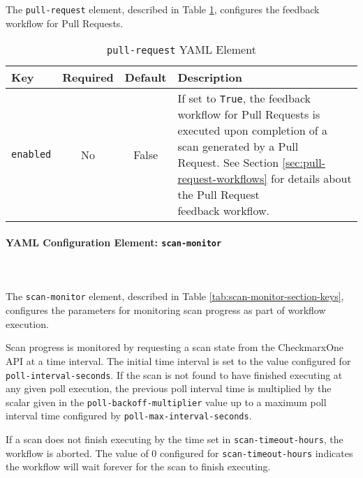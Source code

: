 \noindent\\\\The \texttt{pull-request} element, described in 
Table \ref{tab:pull-request-section-keys}, configures the feedback workflow for
Pull Requests.

\begin{table}[h]
    \caption{\texttt{pull-request} YAML Element}  
    \label{tab:pull-request-section-keys}      
    \begin{tabularx}{\textwidth}{lccl}
        \toprule
        \textbf{Key} & \textbf{Required} & \textbf{Default} & \textbf{Description}\\
        \midrule
        \texttt{enabled} & No & False & \makecell[l]{If set to \texttt{True}, the feedback
        workflow for Pull Requests is\\executed upon completion of a scan generated by
        a Pull\\Request. See Section \ref{sec:pull-request-workflows} for details about
        the Pull Request\\feedback workflow.}\\
        \bottomrule
    \end{tabularx}
\end{table}

\paragraph{YAML Configuration Element: \texttt{scan-monitor} }\label{sec:scan-monitor-element}

\noindent\\\\The \texttt{scan-monitor} element, described in 
Table \ref{tab:scan-monitor-section-keys}, configures the parameters for monitoring scan
progress as part of workflow execution.

Scan progress is monitored by requesting a scan state from the CheckmarxOne API at
a time interval.  The initial time interval is set to the value configured for
\texttt{poll-interval-seconds}.  If the scan is not found to have finished executing
at any given poll execution, the previous poll interval time is multiplied by
the scalar given in the \texttt{poll-backoff-multiplier} value up to a maximum
poll interval time configured by \texttt{poll-max-interval-seconds}.

If a scan does not finish executing by the time set in \texttt{scan-timeout-hours}, the
workflow is aborted.  The value of 0 configured for \texttt{scan-timeout-hours} indicates
the workflow will wait forever for the scan to finish executing.

